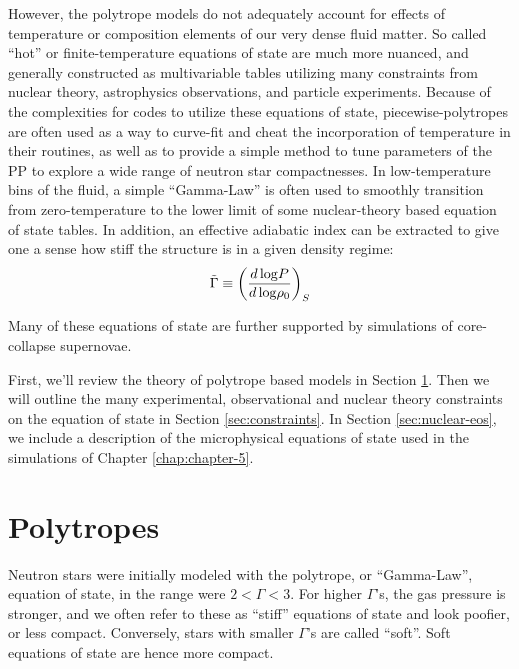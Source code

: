 However, the polytrope models do not adequately account for effects of temperature or composition elements of our very dense fluid matter.  
So called ``hot'' or finite-temperature equations of state are much more nuanced, and generally constructed as multivariable tables utilizing many constraints from nuclear theory, astrophysics observations, and particle experiments.
Because of the complexities for codes to utilize these equations of state, piecewise-polytropes are often used as a way to curve-fit and cheat the incorporation of temperature in their routines, as well as to provide a simple method to tune parameters of the PP to explore a wide range of neutron star compactnesses.
In low-temperature bins of the fluid, a simple ``Gamma-Law'' is often used to smoothly transition from zero-temperature to the lower limit of some nuclear-theory based equation of state tables.
In addition, an effective adiabatic index can be extracted to give one a sense how stiff the structure is in a given density regime:
\begin{align}
\label{e:adiabat}
\tilde{\Gamma} \equiv \left( \frac{d\, {\rm log} P}{d\, {\rm log} \rho_0} \right) _S
\end{align}

Many of these equations of state are further supported by simulations of core-collapse supernovae.

First, we'll review the theory of polytrope based models in Section \ref{sec:polytropes}. Then we will outline the many experimental, observational and nuclear theory constraints on the equation of state in Section \ref{sec:constraints}.   In Section \ref{sec:nuclear-eos}, we include a description of the microphysical equations of state used in the simulations of Chapter \ref{chap:chapter-5}. 


\section{Polytropes}
\label{sec:polytropes}

Neutron stars were initially modeled with the polytrope, or ``Gamma-Law'', equation of state, in the range were $2 < \Gamma < 3$.
For higher $\Gamma$'s, the gas pressure is stronger, and we often refer to these as ``stiff'' equations of state and look poofier, or less compact.
Conversely, stars with smaller $\Gamma$'s are called ``soft''.  Soft equations of state are hence more compact.

